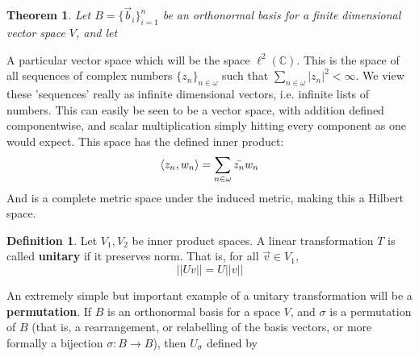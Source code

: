 \documentclass{article}
\theoremstyle{definition}
\newtheorem{definition}{Definition}[section]
\theoremstyle{plain}
\theoremstyle{theorem}
\newtheorem{theorem}{Theorem}[section]
\begin{document}
	\begin{theorem}
		Let $B = \{\vec{b}_i\}_{i=1}^n$ be an orthonormal basis for a finite dimensional vector space $V$, and let 
	\end{theorem}
	\par A particular vector space which will be the space $\ell^2(\mathbb{C})$. This is the space of all sequences of complex numbers $\{z_n\}_{n \in \omega}$ such that $\sum_{n \in \omega} |z_n|^2 < \infty$. We view these 'sequences' really as infinite dimensional vectors, i.e. infinite lists of numbers. This can easily be seen to be a vector space, with addition defined componentwise, and scalar multiplication simply hitting every component as one would expect. This space has the defined inner product:
	\[ \braket{z_n,w_n} = \sum_{n \in \omega} \bar{z_n}w_n \]
And is a complete metric space under the induced metric, making this a Hilbert space.  
\begin{definition}
	Let $V_1,V_2$ be inner product spaces. A linear transformation $T$ is called \textbf{unitary} if it preserves norm. That is, for all $\vec{v} \in V_1$,
	\[ ||Uv|| = U||v||  \]
\end{definition} 
An extremely simple but important example of a unitary transformation will be a \textbf{permutation}. If $B$ is an orthonormal basis for a space $V$, and $\sigma$ is a permutation of $B$ (that is, a rearrangement, or relabelling of the basis vectors, or more formally a bijection $\sigma: B \to B$), then $U_{\sigma}$ defined by 
\end{document}

